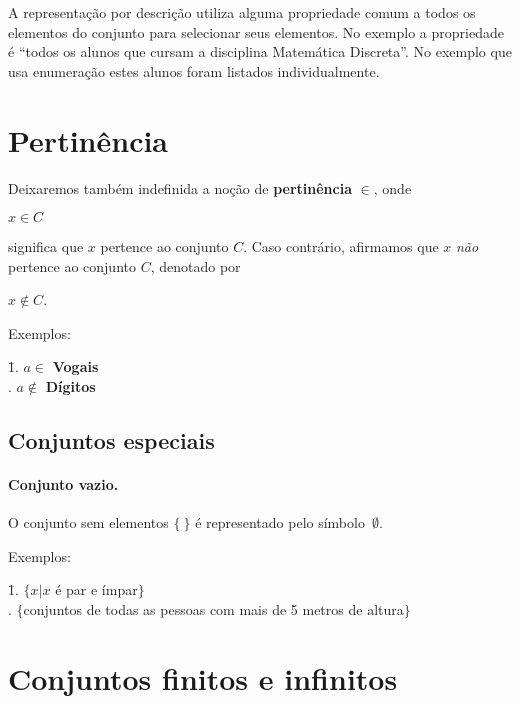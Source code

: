 \documentclass[twoside,a4wide,12pt]{book}
\begin{document}
A representação por descrição utiliza alguma propriedade comum a todos
os elementos do conjunto para selecionar seus elementos. No exemplo a
propriedade é ``todos os alunos que cursam a disciplina Matemática
Discreta''. No exemplo que usa enumeração estes alunos foram listados
individualmente.

\section{Pertinência}

Deixaremos também indefinida a noção de {\bf pertinência} $\in$, onde
\begin{center}
  $x \in C$
\end{center}
significa que $x$ pertence ao conjunto $C$. Caso contrário, afirmamos
que $x$ {\it não\/} pertence ao conjunto $C$, denotado por
\begin{center}
  $x\notin C$.
\end{center}

\noindent Exemplos:
\begin{tabbing}
  \hspace{1cm}\=1. $a\in$ {\bf Vogais}\\
  . $a\notin$ {\bf Dígitos}\\
\end{tabbing}

\subsection{Conjuntos especiais}

\paragraph{Conjunto vazio.} O conjunto sem elementos $\{\ \}$ é
representado pelo símbolo~$\emptyset$.

\bigskip
\noindent Exemplos:
\begin{tabbing}
  \hspace{1cm}\=1. $\{x|x$ é par e ímpar$\}$\\
  . $\{$conjuntos de todas as pessoas com mais de 5 metros de altura$\}$\\
\end{tabbing}

\section{Conjuntos finitos e infinitos}
\end{document}
